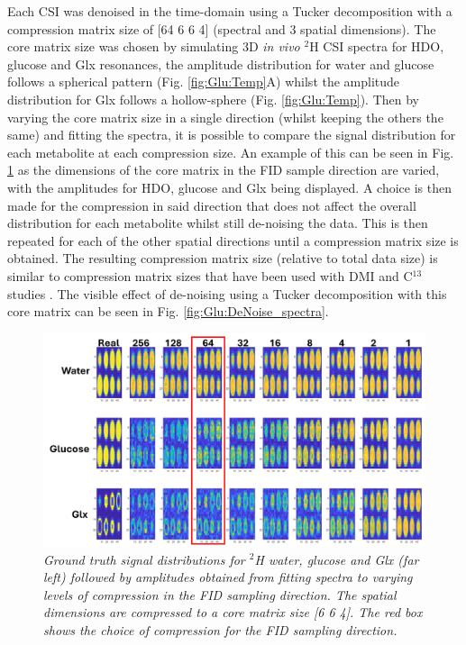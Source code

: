 Each \ac{CSI} was denoised in the time-domain using a Tucker decomposition \cite{Bader2007EfficientTensors} with a compression matrix size of [64 6 6 4] (spectral and 3 spatial dimensions). The core matrix size was chosen by simulating 3D \textit{in vivo} $^2$H \ac{CSI} spectra for HDO, glucose and Glx resonances, the amplitude distribution for water and glucose follows a spherical pattern (Fig. \ref{fig:Glu:Temp}A) whilst the amplitude distribution for Glx follows a hollow-sphere (Fig. \ref{fig:Glu:Temp}). Then by varying the core matrix size in a single direction (whilst keeping the others the same) and fitting the spectra, it is possible to compare the signal distribution for each metabolite at each compression size. An example of this can be seen in Fig. \ref{fig:Glu:DeNoise} as the dimensions of the core matrix in the FID sample direction are varied, with the amplitudes for HDO, glucose and Glx being displayed. A choice is then made for the compression in said direction that does not affect the overall distribution for each metabolite whilst still de-noising the data. This is then repeated for each of the other spatial directions until a compression matrix size is obtained. The resulting compression matrix size (relative to total data size) is similar to compression matrix sizes that have been used with \ac{DMI} \cite{vonMorze2021ComparisonT, Kreis2020MeasuringMRI} and C$^{13}$ studies \cite{Brender2019DynamicHyperpolarization}. The visible effect of de-noising using a Tucker decomposition with this core matrix can be seen in Fig. \ref{fig:Glu:DeNoise_spectra}.

\begin{figure}
   \centering
   \includegraphics[width = 1\textwidth]{Figures/Glucose/DeNoise_Sim.png}
   \caption{\textit{Ground truth signal distributions for $^2$H water, glucose and Glx (far left) followed by amplitudes obtained from fitting spectra to varying levels of compression in the FID sampling direction. The spatial dimensions are compressed to a core matrix size [6 6 4]. The red box shows the choice of compression for the FID sampling direction.}}
   \label{fig:Glu:DeNoise}
\end{figure}

